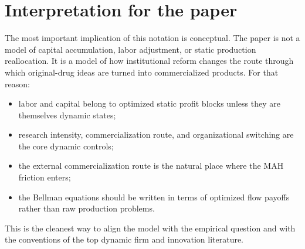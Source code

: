 \documentclass[12pt]{ctexart}
\begin{document}
\section{Interpretation for the paper}

The most important implication of this notation is conceptual. The paper is not a model
of capital accumulation, labor adjustment, or static production reallocation. It is a model
of how institutional reform changes the route through which original-drug ideas are turned
into commercialized products. For that reason:

\begin{itemize}[leftmargin=2em]
    \item labor and capital belong to optimized static profit blocks unless they are themselves dynamic states;
    \item research intensity, commercialization route, and organizational switching are the core dynamic controls;
    \item the external commercialization route is the natural place where the MAH friction enters;
    \item the Bellman equations should be written in terms of optimized flow payoffs rather than raw production problems.
\end{itemize}

This is the cleanest way to align the model with the empirical question and with the
conventions of the top dynamic firm and innovation literature.
\end{document}
